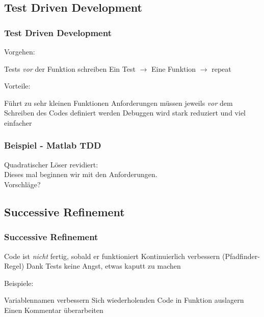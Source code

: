 \documentclass{beamer}
\begin{document}
\subsection{Test Driven Development}
\begin{frame}
    \frametitle{Test Driven Development}
    Vorgehen:

    \begin{outline}
        \1 Tests \emph{vor} der Funktion schreiben
        \1 Ein Test $\rightarrow$ Eine Funktion $\rightarrow$ repeat
    \end{outline}\pause

    Vorteile:

    \begin{outline}
        \1 Führt zu sehr kleinen Funktionen
        \1 Anforderungen müssen jeweils \emph{vor} dem Schreiben des Codes
        definiert werden
        \1 Debuggen wird stark reduziert und viel einfacher
    \end{outline}
\end{frame}
\begin{frame}
    \frametitle{Beispiel - Matlab TDD}
    Quadratischer Löser revidiert:\\
    Dieses mal beginnen wir mit den Anforderungen.\\
    \vspace{1em}\pause
    Vorschläge?
\end{frame}

\subsection{Successive Refinement}
\begin{frame}
    \frametitle{Successive Refinement}
    \begin{outline}
        \1 Code ist \emph{nicht} fertig, sobald er funktioniert
        \1 Kontinuierlich verbessern (Pfadfinder-Regel)
        \1 Dank Tests keine Angst, etwas kaputt zu machen
    \end{outline}
    \pause

    \vspace{1em}Beispiele:
    \begin{outline}
        \1 Variablennamen verbessern
        \1 Sich wiederholenden Code in Funktion auslagern
        \1 Einen Kommentar überarbeiten
    \end{outline}
\end{frame}
\end{document}
